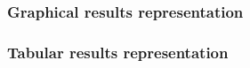 \subsubsection{Graphical results representation}



\FloatBarrier

\subsubsection{Tabular results representation}


